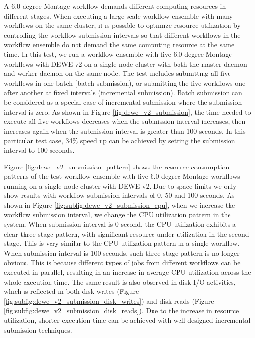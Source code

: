 A 6.0 degree Montage workflow demands different computing resources in different stages. When executing a large scale workflow ensemble with many workflows on the same cluster, it is possible to optimize resource utilization by controlling the workflow submission intervals so that different workflows in the workflow ensemble do not demand the same computing resource at the same time. In this test, we run a workflow ensemble with five 6.0 degree Montage workflows with DEWE v2 on a single-node cluster with both the master daemon and worker daemon on the same node. The test includes submitting all five workflows in one batch (batch submission), or submitting the five workflows one after another at fixed intervals (incremental submission). Batch submission can be considered as a special case of incremental submission where the submission interval is zero. As shown in Figure \ref{fig:dewe_v2_submission}, the time needed to execute all five workflows decreases when the submission interval increases, then increases again when the submission interval is greater than 100 seconds. In this particular test case, 34\% speed up can be achieved by setting the submission interval to 100 seconds.

Figure \ref{fig:dewe_v2_submission_pattern} shows the resource consumption patterns of the test workflow ensemble with five 6.0 degree Montage workflows running on a single node cluster with DEWE v2. Due to space limits we only show results with workflow submission intervals of 0, 50 and 100 seconds. As shown in Figure  \ref{fig:subfig:dewe_v2_submission_cpu}, when we increase the workflow submission interval, we change the CPU utilization pattern in the system. When submission interval is 0 second, the CPU utilization exhibits a clear three-stage pattern, with significant resource under-utilization in the second stage. This is very similar to the CPU utilization pattern in a single workflow. When submission interval is 100 seconds, such three-stage pattern is no longer obvious. This is because different types of jobs from different workflows can be executed in parallel, resulting in an increase in average CPU utilization across the whole execution time. The same result is also observed in disk I/O activities, which is reflected in both disk writes (Figure \ref{fig:subfig:dewe_v2_submission_disk_writes}) and disk reads (Figure \ref{fig:subfig:dewe_v2_submission_disk_reads}). Due to the increase in resource utilization, shorter execution time can be achieved with well-designed incremental submission techniques. 

